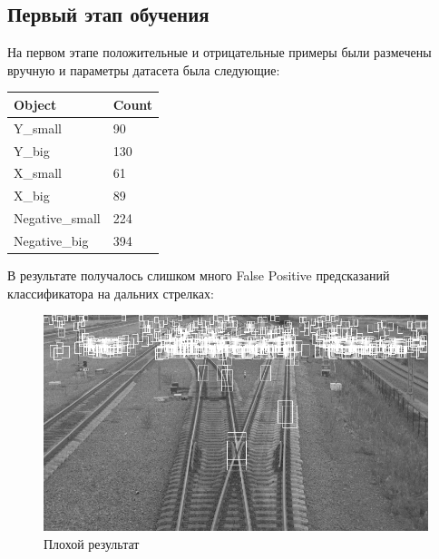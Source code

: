 \subsection{Первый этап обучения}
На первом этапе положительные и отрицательные примеры были размечены вручную и параметры датасета была следующие:
\begin{table}[h!]
	\begin{tabular}{|l|l|}
		\hline
		\textbf{Object}    & \textbf{Count} \\ \hline
		Y\_small        & 90             \\ \hline
		Y\_big          & 130            \\ \hline
		X\_small        & 61             \\ \hline
		X\_big          & 89             \\ \hline
		Negative\_small & 224            \\ \hline
		Negative\_big   & 394            \\ \hline
	\end{tabular}
\end{table}
\newline
В результате получалось слишком много False Positive предсказаний классификатора на дальних стрелках:
\begin{figure}[h!]
	\centering
	\includegraphics[width=0.7\linewidth]{pictures/screenshot32}
	\caption{Плохой результат}
	\label{fig:screenshot32}
\end{figure}

